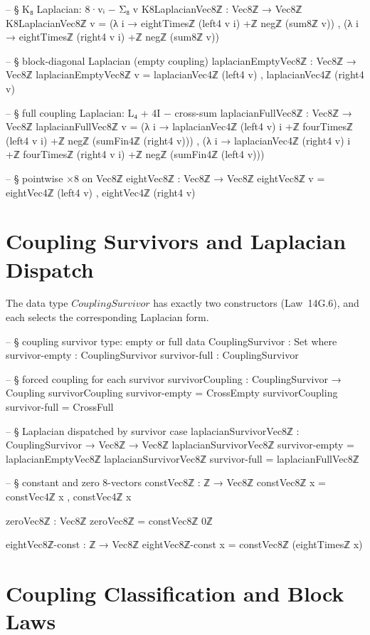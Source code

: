 \documentclass[11pt,a4paper]{book}
\def\texttt#1{#1}%
\begin{document}
\begin{code}
-- § K₈ Laplacian: 8·vᵢ − Σ₈ v
K8LaplacianVec8ℤ : Vec8ℤ → Vec8ℤ
K8LaplacianVec8ℤ v =
  (λ i → eightTimesℤ (left4 v i) +ℤ negℤ (sum8ℤ v)) ,
  (λ i → eightTimesℤ (right4 v i) +ℤ negℤ (sum8ℤ v))

-- § block-diagonal Laplacian (empty coupling)
laplacianEmptyVec8ℤ : Vec8ℤ → Vec8ℤ
laplacianEmptyVec8ℤ v = laplacianVec4ℤ (left4 v) , laplacianVec4ℤ (right4 v)

-- § full coupling Laplacian: L₄ + 4I − cross-sum
laplacianFullVec8ℤ : Vec8ℤ → Vec8ℤ
laplacianFullVec8ℤ v =
  (λ i → laplacianVec4ℤ (left4 v) i +ℤ fourTimesℤ (left4 v i) +ℤ negℤ (sumFin4ℤ (right4 v))) ,
  (λ i → laplacianVec4ℤ (right4 v) i +ℤ fourTimesℤ (right4 v i) +ℤ negℤ (sumFin4ℤ (left4 v)))

-- § pointwise ×8 on Vec8ℤ
eightVec8ℤ : Vec8ℤ → Vec8ℤ
eightVec8ℤ v = eightVec4ℤ (left4 v) , eightVec4ℤ (right4 v)
\end{code}

\section{Coupling Survivors and Laplacian Dispatch}

The data type $\texttt{CouplingSurvivor}$ has exactly two constructors
(Law~14G.6), and each selects the corresponding Laplacian form.

\begin{code}
-- § coupling survivor type: empty or full
data CouplingSurvivor : Set where
  survivor-empty : CouplingSurvivor
  survivor-full  : CouplingSurvivor

-- § forced coupling for each survivor
survivorCoupling : CouplingSurvivor → Coupling
survivorCoupling survivor-empty = CrossEmpty
survivorCoupling survivor-full  = CrossFull

-- § Laplacian dispatched by survivor case
laplacianSurvivorVec8ℤ : CouplingSurvivor → Vec8ℤ → Vec8ℤ
laplacianSurvivorVec8ℤ survivor-empty = laplacianEmptyVec8ℤ
laplacianSurvivorVec8ℤ survivor-full  = laplacianFullVec8ℤ

-- § constant and zero 8-vectors
constVec8ℤ : ℤ → Vec8ℤ
constVec8ℤ x = constVec4ℤ x , constVec4ℤ x

zeroVec8ℤ : Vec8ℤ
zeroVec8ℤ = constVec8ℤ 0ℤ

eightVec8ℤ-const : ℤ → Vec8ℤ
eightVec8ℤ-const x = constVec8ℤ (eightTimesℤ x)
\end{code}

\section{Coupling Classification and Block Laws}
\end{document}
